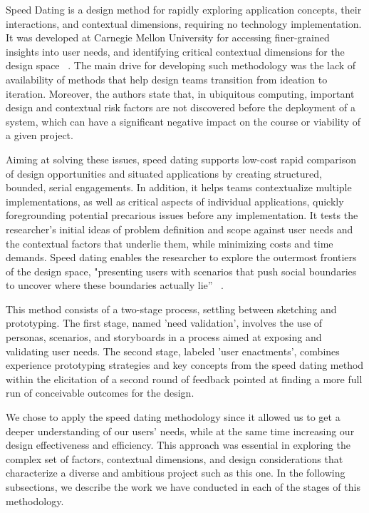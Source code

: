 \cleardoublepage
\label{chap:implement}

Speed Dating is a design method for rapidly exploring application concepts, their interactions, and contextual dimensions, requiring no technology implementation. It was developed at Carnegie Mellon University for accessing finer-grained insights into user needs, and identifying critical contextual dimensions for the design space ~\cite{Davidoff2007}. The main drive for developing such methodology was the lack of availability of methods that help design teams transition from ideation to iteration. Moreover, the authors state that, in ubiquitous computing, important design and contextual risk factors are not discovered before the deployment of a system, which can have a significant negative impact on the course or viability of a given project.

Aiming at solving these issues, speed dating supports low-cost rapid comparison of design opportunities and situated applications by creating structured, bounded, serial engagements. In addition, it helps teams contextualize multiple implementations, as well as critical aspects of individual applications, quickly foregrounding potential precarious issues before any implementation. It tests the researcher's initial ideas of problem definition and scope against user needs and the contextual factors that underlie them, while minimizing costs and time demands. Speed dating enables the researcher to explore the outermost frontiers of the design space, "presenting users with scenarios that push social boundaries to uncover where these boundaries actually lie” ~\cite{Davidoff2007}.

This method consists of a two-stage process, settling between sketching and prototyping. The first stage, named 'need validation', involves the use of personas, scenarios, and storyboards in a process aimed at exposing and validating user needs. The second stage, labeled 'user enactments', combines experience prototyping strategies and key concepts from the speed dating method within the elicitation of a second round of feedback pointed at finding a more full run of conceivable outcomes for the design.

We chose to apply the speed dating methodology since it allowed us to get a deeper understanding of our users' needs, while at the same time increasing our design effectiveness and efficiency. This approach was essential in exploring the complex set of factors, contextual dimensions, and design considerations that characterize a diverse and ambitious project such as this one. In the following subsections, we describe the work we have conducted in each of the stages of this methodology.

